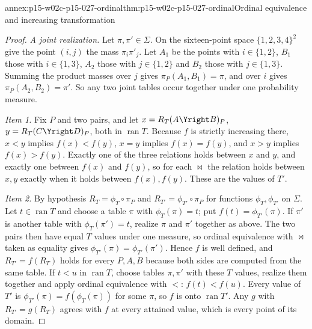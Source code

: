 \begin{annexitem}{annex:p15-w02c-p15-027-ordinal}{thm:p15-w02c-p15-027-ordinal}{Ordinal equivalence and increasing transformation}
\begin{proof}
\emph{A joint realization.} Let \(\pi,\pi'\in\Sigma\). On the sixteen-point
space \(\{1,2,3,4\}^2\) give the point \((i,j)\) the mass
\(\pi_i\pi'_j\). Let \(A_1\) be the points with \(i\in\{1,2\}\), \(B_1\)
those with \(i\in\{1,3\}\), \(A_2\) those with \(j\in\{1,2\}\) and \(B_2\)
those with \(j\in\{1,3\}\). Summing the product masses over \(j\) gives
\(\pi_P(A_1,B_1)=\pi\), and over \(i\) gives \(\pi_P(A_2,B_2)=\pi'\).
So any two joint tables occur together under one probability measure.

\emph{Item 1.} Fix \(P\) and two pairs, and let
\(x=R_T(A\Yright B)_P\), \(y=R_T(C\Yright D)_P\), both in
\(\operatorname{ran}T\). Because \(f\) is strictly increasing there,
\(x<y\) implies \(f(x)<f(y)\), \(x=y\) implies \(f(x)=f(y)\), and
\(x>y\) implies \(f(x)>f(y)\). Exactly one of the three relations holds
between \(x\) and \(y\), and exactly one between \(f(x)\) and \(f(y)\),
so for each \(\bowtie\) the relation holds between \(x,y\) exactly when
it holds between \(f(x),f(y)\). These are the values of \(T'\).

\emph{Item 2.} By hypothesis \(R_T=\phi_T\circ\pi_P\) and
\(R_{T'}=\phi_{T'}\circ\pi_P\) for functions \(\phi_T,\phi_{T'}\) on
\(\Sigma\). Let \(t\in\operatorname{ran}T\) and choose a table \(\pi\) with
\(\phi_T(\pi)=t\); put \(f(t)=\phi_{T'}(\pi)\). If \(\pi'\) is another
table with \(\phi_T(\pi')=t\), realize \(\pi\) and \(\pi'\) together as
above. The two pairs then have equal \(T\) values under one measure, so
ordinal equivalence with \(\bowtie\) taken as equality gives
\(\phi_{T'}(\pi)=\phi_{T'}(\pi')\). Hence \(f\) is well defined, and
\(R_{T'}=f(R_T)\) holds for every \(P,A,B\) because both sides are
computed from the same table. If \(t<u\) in \(\operatorname{ran}T\),
choose tables \(\pi,\pi'\) with these \(T\) values, realize them together
and apply ordinal equivalence with \(<\): \(f(t)<f(u)\). Every value of
\(T'\) is \(\phi_{T'}(\pi)=f(\phi_T(\pi))\) for some \(\pi\), so \(f\) is
onto \(\operatorname{ran}T'\). Any \(g\) with \(R_{T'}=g(R_T)\) agrees
with \(f\) at every attained value, which is every point of its domain.


\end{proof}
\end{annexitem}
